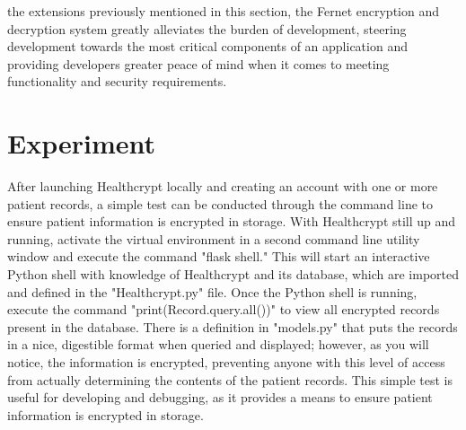 \documentclass[letterpaper, 10pt,DIV=13]{scrartcl}
\begin{document}
\begin{multicols}{2}
\begin{spacing}{1.25}
the extensions previously mentioned in this section, the Fernet encryption and decryption system greatly alleviates the burden of development, steering development towards the most critical components of an application and providing developers greater peace of mind when it comes to meeting functionality and security requirements.
\end{spacing}

\vspace{-2.5pt}

\section*{Experiment}
\begin{spacing}{1.25}
After launching Healthcrypt locally and creating an account with one or more patient records, a simple test can be conducted through the command line to ensure patient information is encrypted in storage. With Healthcrypt still up and running, activate the virtual environment in a second command line utility window and execute the command "flask shell." This will start an interactive Python shell with knowledge of Healthcrypt and its database, which are imported and defined in the "Healthcrypt.py" file. Once the Python shell is running, execute the command "print(Record.query.all())" to view all encrypted records present in the database. There is a definition in "models.py" that puts the records in a nice, digestible format when queried and displayed; however, as you will notice, the information is encrypted, preventing anyone with this level of access from actually determining the contents of the patient records. This simple test is useful for developing and debugging, as it provides a means to ensure patient information is encrypted in storage.
\end{spacing}

\vspace{-2.5pt}


\end{multicols}
\end{document}
